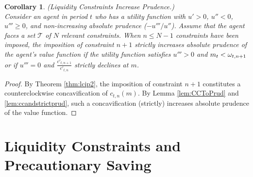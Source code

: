 \documentclass[titlepage]{\econtex}
\newcommand{\ifVerbatimWrite}{\ifthenelse{\boolean{verbatimwriteOn}}} %
\renewenvironment{verbatimwrite}[1]{} %
\providecommand{\wAlt}{\omega}
\newtheorem{corollary}{Corollary}
\begin{document}
\begin{verbatimwrite}{./Sections/LCandCC}
  \begin{corollary}\label{cor:lcip} (Liquidity Constraints Increase Prudence.) \\
    Consider an agent in period $t$ who has a utility function with $u' > 0$, $u'' < 0$, $u''' \geq 0$, and non-increasing absolute prudence ($-u'''/u''$). Assume that the agent faces a set $\mathcal{T}$ of $N$ relevant constraints. When $n \leq N-1$ constraints have been imposed, the imposition of constraint $n+1$ strictly increases absolute prudence of the agent's value function if the utility function satisfies $u''' > 0$ and ${m}_{t} < \wAlt_{t,n+1}$ or if $u''' = 0$ and $\frac{c'_{t,n+1}}{c'_{t,n}}$ strictly declines at ${m}$.
  \end{corollary}
  \begin{proof}
    By Theorem \ref{thm:lcip2}, the imposition of constraint $n+1$ constitutes a counterclockwise concavification of $c_{t,n}({m})$. By Lemma \ref{lem:CCToPrud} and \ref{lem:ccandstrictprud}, such a concavification (strictly) increases absolute prudence of the value function.
  \end{proof}
  \noindent %



  \newpage
\end{verbatimwrite}\ifVerbatimWrite{}{} %

\section{Liquidity Constraints and Precautionary Saving}
\label{sec:LCandPS}
\end{document}
